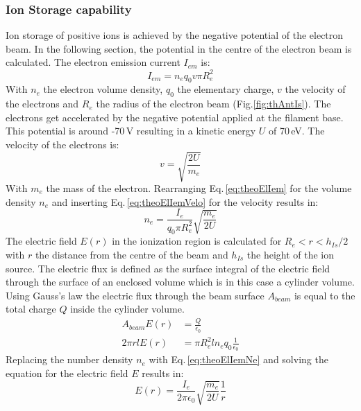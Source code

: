		\subsubsection{Ion Storage capability}\label{chap:IonStor}
		Ion storage of positive ions is achieved by the negative potential of the electron beam. In the following section, the potential in the centre of the electron beam is calculated. The electron emission current $I_{em}$ is:
		\begin{equation}
			I_{em} = n_e q_0 v\pi R_e^2
			\label{eq:theoElIem}
		\end{equation}
		With $n_e$ the electron volume density, $q_0$ the elementary charge, $v$ the velocity of the electrons and $R_e$ the radius of the electron beam (Fig.\ref{fig:thAntIs}). The electrons get accelerated by the negative potential applied at the filament base. This potential is around -70\,\si{\volt} resulting in a kinetic energy $U$ of 70\,\si{\electronvolt}. The velocity of the electrons is:
		\begin{equation}
			v = \sqrt{\frac{2 U}{m_e}}
			\label{eq:theoElIemVelo}
		\end{equation}
		With $m_e$ the mass of the electron. Rearranging Eq.\,\eqref{eq:theoElIem} for the volume density $n_e$ and inserting Eq.\,\eqref{eq:theoElIemVelo} for the velocity results in:
		\begin{equation}
			n_e = \frac{I_e}{q_0 \pi R_e^2}\sqrt{\frac{m_e}{2U}}						\label{eq:theoElIemNe}
		\end{equation}
		The electric field $E(r)$ in the ionization region is calculated for $R_e<r<h_{Is}/2$ with $r$ the distance from the centre of the beam and $h_{Is}$ the height of the ion source. The electric flux is defined as the surface integral of the electric field through the surface of an enclosed volume which is in this case a cylinder volume. Using Gauss's law the electric flux through the beam surface $A_{beam}$ is equal to the total charge $Q$ inside the cylinder volume.
		\begin{align}
			A_{beam} E(r) &= \frac{Q}{\epsilon_0}\\
			2\pi r l E(r) &= \pi R_e^2 l n_e q_0 \frac{1}{\epsilon_0}
		\end{align}
		Replacing the number density $n_e$ with Eq.\,\eqref{eq:theoElIemNe} and solving the equation for the electric field $E$ results in:
		\begin{equation}
			E(r) = \frac{I_e}{2 \pi \epsilon_0} \sqrt{\frac{m_e}{2U}}\frac{1}{r}
		\end{equation}
